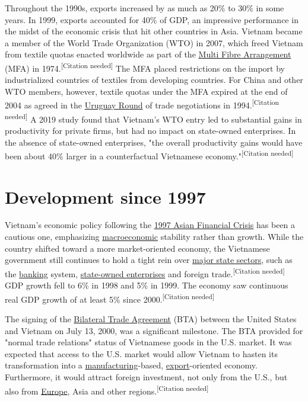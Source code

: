 \documentclass[openany]{book}
\begin{document}
Throughout the 1990s, exports increased by as much as 20\% to 30\% in some years. In 1999, exports accounted for 40\% of GDP, an impressive performance in the midst of the economic crisis that hit other countries in Asia. Vietnam became a member of the World Trade Organization (WTO) in 2007, which freed Vietnam from textile quotas enacted worldwide as part of the \href{https://en.wikipedia.org/wiki/Multi_Fibre_Arrangement}{Multi Fibre Arrangement} (MFA) in 1974.\textsuperscript{[Citation needed]} The MFA placed restrictions on the import by industrialized countries of textiles from developing countries. For China and other WTO members, however, textile quotas under the MFA expired at the end of 2004 as agreed in the \href{https://en.wikipedia.org/wiki/Uruguay_Round}{Uruguay Round} of trade negotiations in 1994.\textsuperscript{[Citation needed]} A 2019 study found that Vietnam's WTO entry led to substantial gains in productivity for private firms, but had no impact on state-owned enterprises. In the absence of state-owned enterprises, "the overall productivity gains would have been about 40\% larger in a counterfactual Vietnamese economy."\textsuperscript{[Citation needed]}

\section{Development since 1997}
Vietnam's economic policy following the \href{https://en.wikipedia.org/wiki/1997_Asian_Financial_Crisis}{1997 Asian Financial Crisis} has been a cautious one, emphasizing \href{https://en.wikipedia.org/wiki/Macroeconomic}{macroeconomic} stability rather than growth. While the country shifted toward a more market-oriented economy, the Vietnamese government still continues to hold a tight rein over \href{https://en.wikipedia.org/wiki/Public_sector}{major state sectors}, such as the \href{https://en.wikipedia.org/wiki/Bank}{banking} system, \href{https://en.wikipedia.org/wiki/State-owned_enterprises}{state-owned enterprises} and foreign trade.\textsuperscript{[Citation needed]} GDP growth fell to 6\% in 1998 and 5\% in 1999. The economy saw continuous real GDP growth of at least 5\% since 2000.\textsuperscript{[Citation needed]}

The signing of the \href{https://en.wikipedia.org/wiki/Bilateral_Trade_Agreement}{Bilateral Trade Agreement} (BTA) between the United States and Vietnam on July 13, 2000, was a significant milestone. The BTA provided for "normal trade relations" status of Vietnamese goods in the U.S. market. It was expected that access to the U.S. market would allow Vietnam to hasten its transformation into a \href{https://en.wikipedia.org/wiki/Manufacturing}{manufacturing}-based, \href{https://en.wikipedia.org/wiki/Export}{export}-oriented economy. Furthermore, it would attract foreign investment, not only from the U.S., but also from \href{https://en.wikipedia.org/wiki/Europe}{Europe}, Asia and other regions.\textsuperscript{[Citation needed]}
\end{document}
